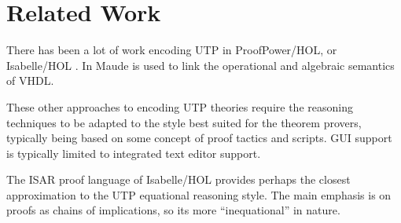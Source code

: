 \section{Related Work}\label{sec:related}

There has been a lot of work encoding UTP
in ProofPower/HOL\cite{conf/utp/OliveiraCW06,conf/utp/ZC08,journal/facs/ocw13},
or Isabelle/HOL \cite{conf/utp/FeliachiGW10,conf/vstte/FeliachiGW12,journal/scp/zc12a}.
In \cite{conf/utp/ZhuLHQ12} Maude is used to link the operational
and algebraic semantics of VHDL.

These other approaches to encoding UTP theories require
the reasoning techniques to be adapted to the style best suited
for the theorem provers, typically being based on some concept of proof tactics
and scripts. GUI support is typically limited to integrated text editor support.

The ISAR proof language of Isabelle/HOL\cite{rep:ppIHOL:13}
provides perhaps the closest approximation to the UTP equational reasoning style.
The main emphasis is on proofs as chains of implications,
so its more ``inequational'' in nature.
